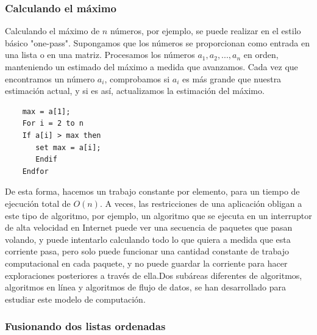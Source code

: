 \documentclass[a4paper, 12pt]{book}
\begin{document}
\subsubsection*{Calculando el máximo}

Calculando el máximo de $n$ números, por ejemplo, se puede realizar en el estilo básico "one-pass". Supongamos que los números se proporcionan como entrada en una lista o en una matriz. Procesamos los números $a_1, a_2,. . ., a_n$ en orden, manteniendo un estimado del máximo a medida que avanzamos. Cada vez que encontramos un número $a_i$, comprobamos si $a_i$ es más grande que nuestra estimación actual, y si es así, actualizamos la estimación del máximo.\\


\begin{lstlisting}
	max = a[1];
	For i = 2 to n
	If a[i] > max then
	   set max = a[i];
	   Endif
	Endfor
\end{lstlisting}

De esta forma, hacemos un trabajo constante por elemento, para un tiempo de ejecución total de $O(n)$. A veces, las restricciones de una aplicación obligan a este tipo de algoritmo, por ejemplo, un algoritmo que se ejecuta en un interruptor de alta velocidad en Internet puede ver una secuencia de paquetes que pasan volando, y puede intentarlo calculando todo lo que quiera a medida que esta corriente pasa, pero solo puede funcionar una cantidad constante de trabajo computacional en cada paquete, y no puede guardar la corriente para hacer exploraciones posteriores a través de ella.Dos subáreas diferentes de algoritmos, algoritmos en línea y algoritmos de flujo de datos, se han desarrollado para estudiar este modelo de computación.\\

\subsubsection*{Fusionando dos listas ordenadas}
\end{document}
